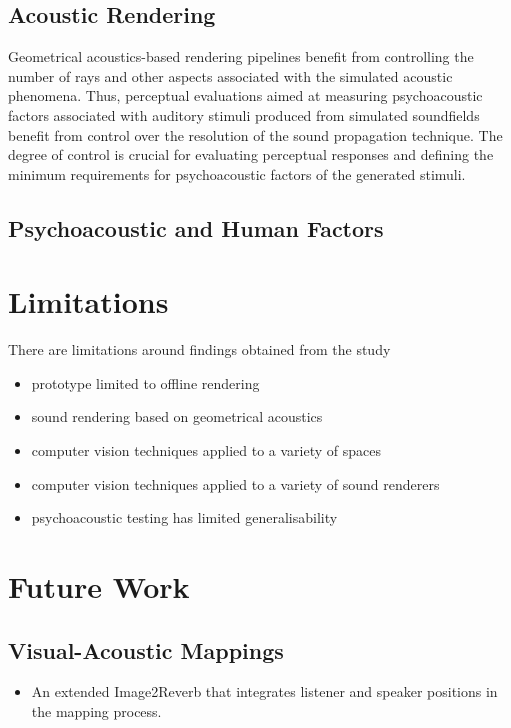 \subsection{Acoustic Rendering}
Geometrical acoustics-based rendering pipelines benefit from controlling the number of rays and other aspects associated with the simulated acoustic phenomena. Thus, perceptual evaluations aimed at measuring psychoacoustic factors associated with auditory stimuli produced from simulated soundfields benefit from control over the resolution of the sound propagation technique. The degree of control is crucial for evaluating perceptual responses and defining the minimum requirements for psychoacoustic factors of the generated stimuli.\par

\subsection{Psychoacoustic and Human Factors}

\section{Limitations}
There are limitations around findings obtained from the study
\begin{itemize}
    \item prototype limited to offline rendering
    \item sound rendering based on geometrical acoustics
    \item computer vision techniques applied to a variety of spaces
    \item computer vision techniques applied to a variety of sound renderers
    \item psychoacoustic testing has limited generalisability
\end{itemize}

\section{Future Work}

\subsection{Visual-Acoustic Mappings}
\begin{itemize}
    \item An extended Image2Reverb that integrates listener and speaker positions in the mapping process.
\end{itemize}

